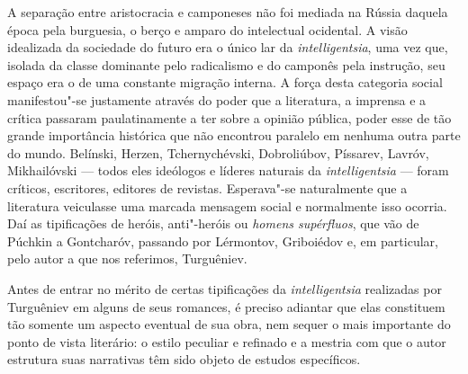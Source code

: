 A separação entre aristocracia e camponeses não foi mediada na Rússia
daquela época pela burguesia, o berço e amparo do intelectual ocidental. A
visão idealizada da sociedade do futuro era o único lar da \emph{intelligentsia}, uma vez que,
isolada da classe dominante pelo radicalismo e do
camponês pela instrução, seu espaço era o de uma constante migração interna. A força desta categoria social manifestou"-se justamente através do poder que a literatura, a imprensa e a crítica passaram paulatinamente a ter sobre a opinião pública, poder esse de tão grande importância histórica que não encontrou paralelo em nenhuma outra parte do mundo. Belínski, Herzen, Tchernychévski, Dobroliúbov, Píssarev, Lavróv, Mikhailóvski --- todos eles ideólogos e líderes naturais da \emph{intelligentsia} --- foram críticos, escritores,
editores de revistas. Esperava"-se naturalmente que a literatura
veiculasse uma marcada mensagem social e normalmente isso ocorria. Daí as tipificações de heróis, anti"-heróis ou \emph{homens supérfluos}, que vão de Púchkin a Gontcharóv, passando por Lérmontov, Griboiédov e, em particular, pelo autor a que nos referimos, Turguêniev.

Antes de entrar no mérito de certas tipificações da \emph{intelligentsia}
realizadas por Turguêniev em alguns de seus romances, é preciso adiantar
que elas constituem tão somente um aspecto eventual de sua obra, nem sequer o mais importante
do ponto de vista literário: o estilo
peculiar e refinado e a mestria com que o autor estrutura suas
narrativas têm sido objeto de estudos específicos.

